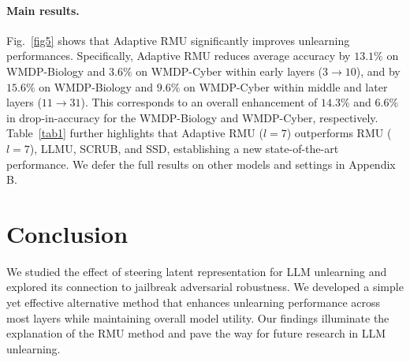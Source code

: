 \documentclass[letterpaper]{article} %
\begin{document}
\paragraph{Main results.}
\begin{table}[!t]
    \centering
    \caption{Q\&A accuracy of Zephyr-7B models on WMDP and MMLU. The $\textbf{best}$ and $\underline{\textnormal{runner up}}$ are marked.}
    \label{tab1}
\end{table}
Fig.~\ref{fig5} shows that Adaptive RMU significantly improves unlearning performances. Specifically, Adaptive RMU reduces average accuracy by $13.1\%$ on WMDP-Biology and $3.6\%$ on WMDP-Cyber within early layers ($3\to10$), and by $15.6\%$ on WMDP-Biology and $9.6\%$ on WMDP-Cyber within middle and later layers ($11\to31$). This corresponds to an overall enhancement of $14.3\%$ and $6.6\%$ in drop-in-accuracy for the WMDP-Biology and WMDP-Cyber, respectively. Table~\ref{tab1} further highlights that Adaptive RMU ($l=7$) outperforms RMU ($l=7$), LLMU, SCRUB, and SSD,  
establishing a new state-of-the-art performance.
We defer the full results on other models and settings in Appendix B.

\section{Conclusion}
We studied the effect of steering latent representation for LLM unlearning and explored its connection to jailbreak adversarial robustness. We developed a simple yet effective alternative method that enhances unlearning performance across most layers while maintaining overall model utility. Our findings illuminate the explanation of the RMU method and pave the way for future research in LLM unlearning.
\end{document}
